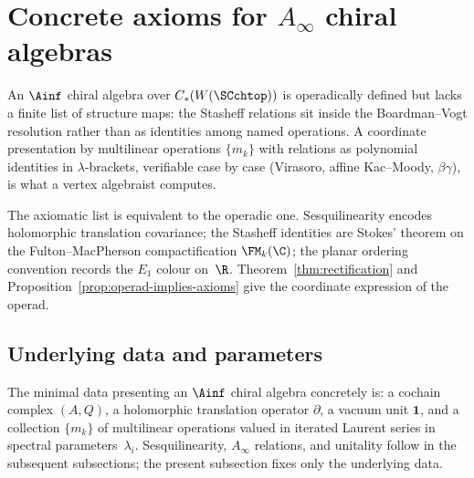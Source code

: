 \section{Concrete axioms for $A_\infty$ chiral algebras}
\label{sec:axioms-Ainfty-chiral}

An $\Ainf$ chiral algebra over $C_\ast(W(\SCchtop))$ is operadically
defined but lacks a finite list of structure maps: the Stasheff
relations sit inside the Boardman--Vogt resolution rather than as
identities among named operations. A coordinate presentation by
multilinear operations $\{m_k\}$ with relations as polynomial
identities in $\lambda$-brackets, verifiable case by case
(Virasoro, affine Kac--Moody, $\beta\gamma$), is what a vertex
algebraist computes.

The axiomatic list is equivalent to the operadic one.
Sesquilinearity encodes holomorphic translation covariance; the
Stasheff identities are Stokes' theorem on the Fulton--MacPherson
compactification $\FM_k(\C)$; the planar ordering convention
records the $E_1$ colour on~$\R$.
Theorem~\ref{thm:rectification} and
Proposition~\ref{prop:operad-implies-axioms} give the coordinate
expression of the operad.

\subsection{Underlying data and parameters}
\label{subsec:underlying-data}

The minimal data presenting an $\Ainf$ chiral algebra concretely is:
a cochain complex $(A, Q)$, a holomorphic translation operator
$\partial$, a vacuum unit $\mathbf{1}$, and a collection $\{m_k\}$ of
multilinear operations valued in iterated Laurent series in spectral
parameters~$\lambda_i$. Sesquilinearity, $A_\infty$ relations, and
unitality follow in the subsequent subsections; the present
subsection fixes only the underlying data.

